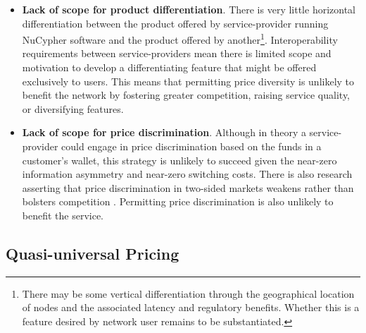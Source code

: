 \documentclass[longbibliography,nofootinbib]{revtex4-1}
\begin{document}
\begin{itemize}
    \item \textbf{Lack of scope for product differentiation}. There is very little horizontal differentiation between the product offered by service-provider running NuCypher software and the product offered by another\footnote{There may be some vertical differentiation through the geographical location of nodes and the associated latency and regulatory benefits. Whether this is a feature desired by network user remains to be substantiated.}. Interoperability requirements between service-providers mean there is limited scope and motivation to develop a differentiating feature that might be offered exclusively to users. This means that permitting price diversity is unlikely to benefit the network by fostering greater competition, raising service quality, or diversifying features. 
    \item \textbf{Lack of scope for price discrimination}. Although in theory a service-provider could engage in price discrimination based on the funds in a customer’s wallet, this strategy is unlikely to succeed given the near-zero information asymmetry and near-zero switching costs. There is also research asserting that price discrimination in two-sided markets weakens rather than bolsters competition \cite{discrim}. Permitting price discrimination is also unlikely to benefit the service.
\end{itemize}

\subsection{Quasi-universal Pricing}
\end{document}
